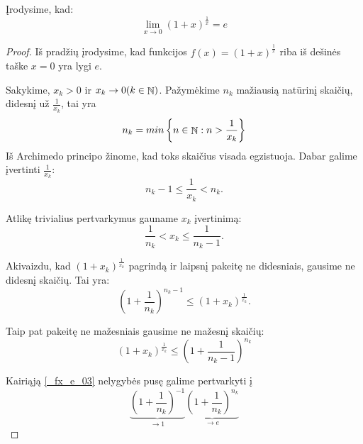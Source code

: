 \begin{exmp}
  Įrodysime, kad:
  \begin{equation}
    \lim_{x \to 0} (1 + x)^{\frac{1}{x}} = e
    \label{_fx_e_01}
  \end{equation}

  \begin{proof}

    Iš pradžių įrodysime, kad funkcijos $f(x) = (1 + x)^{\frac{1}{x}}$ 
    riba iš dešinės taške $x = 0$ yra lygi $e$.

    Sakykime, $x_k > 0$ ir $x_k \to 0 (k \in \mathop{\mathbb{N}})$. Pažymėkime $n_k$ 
    mažiausią natūrinį skaičių, didesnį už $\frac{1}{x_k}$, tai yra 
    \begin{equation*}
      n_{k} = min \left\{ n \in \mathop{\mathbb{N}} : n > \frac{1}{x_{k}} \right\}
    \end{equation*}
    Iš Archimedo principo žinome, kad toks skaičius visada egzistuoja.
    Dabar galime įvertinti $\frac{1}{x_k}$:
    \begin{equation*}
      n_k - 1 \leq \frac{1}{x_k} < n_k.
    \end{equation*}

    Atlikę trivialius pertvarkymus gauname $x_k$ įvertinimą:
    \begin{equation*}
      \frac{1}{n_{k}} < x_k \leq \frac{1}{n_{k} - 1}.
    \end{equation*}

    Akivaizdu, kad $(1 + x_{k})^\frac{1}{x_{k}}$ pagrindą ir laipsnį 
    pakeitę ne didesniais, gausime ne didesnį skaičių. Tai yra:
    \begin{equation}
      \left( 1 + \frac{1}{n_{k}} \right)^{n_{k} - 1}
      \leq (1 + x_{k})^\frac{1}{x_{k}}.
      \label{_fx_e_03}
    \end{equation}

    Taip pat pakeitę ne mažesniais gausime ne mažesnį skaičių:
    \begin{equation}
      (1 + x_{k})^{\frac{1}{x_{k}}} 
      \leq \left( 1 + \frac{1}{n_{k} - 1} \right)^{n_{k}}
      \label{_fx_e_04}
    \end{equation}

    Kairiąją \ref{_fx_e_03} nelygybės pusę galime pertvarkyti į 
    \begin{equation}
      \underbrace{\left( 1 + \frac{1}{n_{k}} \right)^{-1}}_{\to 1}
      \underbrace{\left( 1 + \frac{1}{n_{k}} \right)^{n_{k}}}_{\to e}
      \label{_fx_e_05}
    \end{equation}


\end{proof}
\end{exmp}
